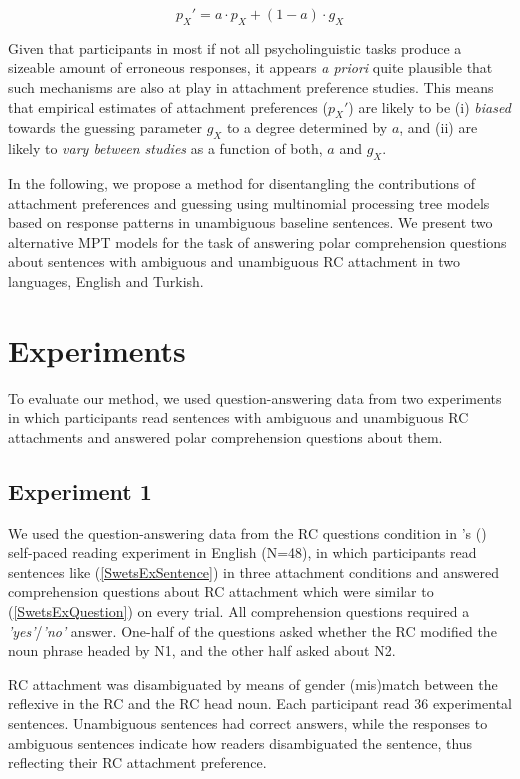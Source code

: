 \documentclass[11pt]{article}\usepackage[]{graphicx}\usepackage[]{color}
\def\citeapos#1{\citeauthor{#1}'s (\citeyear{#1})}
\begin{document}
\begin{equation}
p_{X}' = a \cdot p_{X} + (1-a) \cdot g_X
\label{eq:EqEx1}
\end{equation}

Given that participants in most if not all psycholinguistic tasks produce a sizeable amount of erroneous responses, it appears \textit{a priori} quite plausible that such mechanisms are also at play in attachment preference studies. This means that empirical estimates of attachment preferences ($p_X'$) are likely to be (i) \textit{biased} towards the guessing parameter $g_X$ to a degree determined by $a$, and (ii) are likely to \textit{vary between studies} as a function of both, $a$ and $g_X$.

In the following, we propose a method for disentangling the contributions of attachment preferences and guessing using multinomial processing tree models \citep[MPT;][]{ErdfelderEtAl:2009, BatchelderRiefer:1999} based on response patterns in unambiguous baseline sentences. We present two alternative MPT models for the task of answering polar comprehension questions about sentences with ambiguous and unambiguous RC attachment in two languages, English and Turkish.


\section{Experiments}

To evaluate our method, we used question-answering data from two experiments in which participants read sentences with ambiguous and unambiguous RC attachments and answered polar comprehension questions about them.

\subsection{Experiment 1}
We used the question-answering data from the RC questions condition in \citeapos{SwetsEtAl:2008} self-paced reading experiment in English (N=48), in which participants read sentences like (\ref{SwetsExSentence}) in three attachment conditions and answered comprehension questions about RC attachment which were similar to (\ref{SwetsExQuestion}) on every trial. All comprehension questions required a \textit{'yes'}/\textit{'no'} answer. One-half of the questions asked whether the RC modified the noun phrase headed by N1, and the other half asked about N2.

RC attachment was disambiguated by means of gender (mis)match between the reflexive in the RC and the RC head noun. Each participant read 36 experimental sentences. Unambiguous sentences had correct answers, while the responses to ambiguous sentences indicate how readers disambiguated the sentence, thus reflecting their RC attachment preference.
\end{document}

